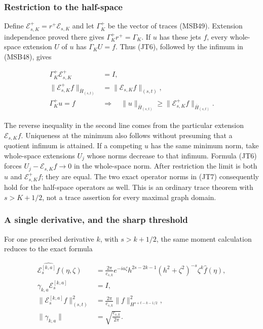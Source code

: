 \documentclass[
  11pt,
]{article}
\begin{document}
\subsubsection{Restriction to the
half-space}\label{restriction-to-the-half-space}

Define \(\mathcal E_{s,K}^+=r^+\mathcal E_{s,K}\) and let \(\Gamma_K^+\)
be the vector of traces (MSB49). Extension independence proved there
gives \(\Gamma_K^+r^+=\Gamma_K\). If \(u\) has these jets \(f\), every
whole-space extension \(U\) of \(u\) has \(\Gamma_KU=f\). Thus (JT6),
followed by the infimum in (MSB48), gives

\[
 \begin{aligned}
 \Gamma_K^+\mathcal E_{s,K}^+&=I,\\
 \|\mathcal E_{s,K}^+f\|_{\bar H_{(s,t)}}
   &=\|\mathcal E_{s,K}f\|_{(s,t)},\\
 \Gamma_K^+u=f\quad&\Longrightarrow\quad
 \|u\|_{\bar H_{(s,t)}}\geq
                  \|\mathcal E_{s,K}^+f\|_{\bar H_{(s,t)}}.
 \end{aligned}
 \tag{JT8}
\]

The reverse inequality in the second line comes from the particular
extension \(\mathcal E_{s,K}f\). Uniqueness at the minimum also follows
without presuming that a quotient infimum is attained. If a competing
\(u\) has the same minimum norm, take whole-space extensions \(U_j\)
whose norms decrease to that infimum. Formula (JT6) forces
\(U_j-\mathcal E_{s,K}f\to0\) in the whole-space norm. After restriction
the limit is both \(u\) and \(\mathcal E_{s,K}^+f\); they are equal. The
two exact operator norms in (JT7) consequently hold for the half-space
operators as well. This is an ordinary trace theorem with \(s>K+1/2\),
not a trace assertion for every maximal graph domain.

\subsubsection{A single derivative, and the sharp
threshold}\label{a-single-derivative-and-the-sharp-threshold}

For one prescribed derivative \(k\), with \(s>k+1/2\), the same moment
calculation reduces to the exact formula

\[
 \begin{aligned}
 \widehat{\mathcal E^{[k,a]}_sf}(\eta,\zeta)
 &=\frac{2\pi}{c_{s,k}}e^{-ia\zeta}
       h^{2s-2k-1}(h^2+\zeta^2)^{-s}\zeta^k\widehat f(\eta),\\
 \gamma_{k,a}\mathcal E^{[k,a]}_s&=I,\\
 \|\mathcal E^{[k,a]}_sf\|_{(s,t)}^2
 &=\frac{2\pi}{c_{s,k}}\|f\|_{H^{s+t-k-1/2}}^2,\\
 \|\gamma_{k,a}\|&=\sqrt{\frac{c_{s,k}}{2\pi}}.
 \end{aligned}
 \tag{JT9}
\]
\end{document}
